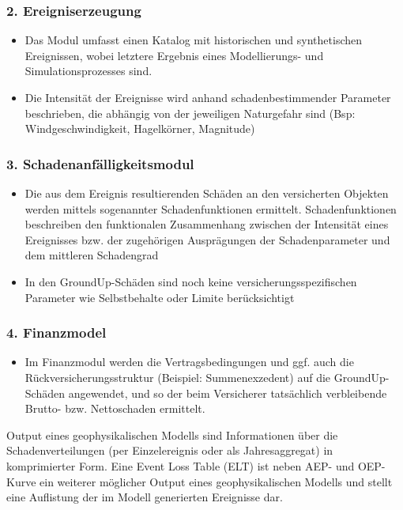 \documentclass[12pt]{report}
\theoremstyle{dotless}
\theoremstyle{definition}
\begin{document}
\subsubsection{2. Ereigniserzeugung}
\begin{itemize}
\item Das Modul umfasst einen Katalog mit historischen und synthetischen Ereignissen,
wobei letztere Ergebnis eines Modellierungs- und Simulationsprozesses sind.
\item Die Intensität der Ereignisse wird anhand schadenbestimmender Parameter
beschrieben, die abhängig von der jeweiligen Naturgefahr sind (Bsp: Windgeschwindigkeit, Hagelkörner, Magnitude)
\end{itemize}

\subsubsection{3. Schadenanfälligkeitsmodul}
\begin{itemize}
\item Die aus dem Ereignis resultierenden Schäden an den versicherten Objekten werden mittels sogenannter Schadenfunktionen ermittelt. Schadenfunktionen beschreiben den funktionalen Zusammenhang zwischen der Intensität eines Ereignisses bzw. der zugehörigen Ausprägungen der Schadenparameter und dem mittleren Schadengrad
\item In den GroundUp-Schäden sind noch keine versicherungsspezifischen Parameter wie
Selbstbehalte oder Limite berücksichtigt
\end{itemize}

\subsubsection{4. Finanzmodel}
\begin{itemize}
\item Im Finanzmodul werden die Vertragsbedingungen und ggf. auch die Rückversicherungsstruktur (Beispiel: Summenexzedent) auf die GroundUp-Schäden angewendet, und so der beim Versicherer tatsächlich verbleibende Brutto- bzw. Nettoschaden ermittelt.
\end{itemize}

Output eines geophysikalischen Modells sind Informationen über die Schadenverteilungen (per
Einzelereignis oder als Jahresaggregat) in komprimierter Form. Eine Event Loss Table (ELT) ist
neben AEP- und OEP-Kurve ein weiterer möglicher Output eines geophysikalischen Modells und
stellt eine Auflistung der im Modell generierten Ereignisse dar.
\end{document}
